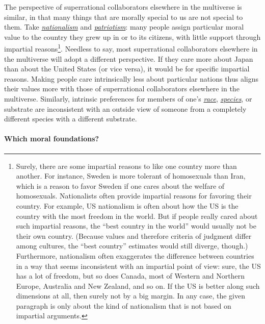 The perspective of superrational collaborators elsewhere in the
multiverse is similar, in that many things that are morally special to
us are not special to them. Take
\href{https://en.wikipedia.org/wiki/Nationalism}{\emph{nationalism}} and
\href{https://en.wikipedia.org/wiki/Patriotism}{\emph{patriotism}}: many
people assign particular moral value to the country they grew up in or
to its citizens, with little support through impartial reasons\footnote{Surely,
  there are some impartial reasons to like one country more than
  another. For instance, Sweden is more tolerant of homosexuals than
  Iran, which is a reason to favor Sweden if one cares about the welfare
  of homosexuals. Nationalists often provide impartial reasons for
  favoring their country. For example, US nationalism is often about how
  the US is the country with the most freedom in the world. But if
  people really cared about such impartial reasons, the ``best country
  in the world'' would usually not be their own country. (Because values
  and therefore criteria of judgment differ among cultures, the ``best
  country'' estimates would still diverge, though.) Furthermore,
  nationalism often exaggerates the difference between countries in a
  way that seems inconsistent with an impartial point of view: sure, the
  US has a lot of freedom, but so does Canada, most of Western and
  Northern Europe, Australia and New Zealand, and so on. If the US is
  better along such dimensions at all, then surely not by a big margin.
  In any case, the given paragraph is only about the kind of nationalism
  that is not based on impartial arguments.}. Needless to say, most
superrational collaborators elsewhere in the multiverse will adopt a
different perspective. If they care more about Japan than about the
United States (or vice versa), it would be for specific impartial
reasons. Making people care intrinsically less about particular nations
thus aligns their values more with those of superrational collaborators
elsewhere in the multiverse. Similarly, intrinsic preferences for
members of one's
\href{https://en.wikipedia.org/wiki/Racism}{\emph{race}},
\href{https://en.wikipedia.org/wiki/Speciesism}{\emph{species}}, or
substrate are inconsistent with an outside view of someone from a
completely different species with a different substrate.

\paragraph{Which moral foundations?}\label{which-moral-foundations}

